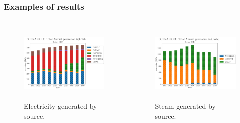 \begin{frame}
\frametitle{Examples of results}

	\begin{columns}
	\column[t]{5cm}
	\begin{figure}[htbp!]
		\begin{center}
			\includegraphics[height=3.8cm]{images/elc-generation.png}
		\end{center}
		\caption{Electricity generated by source.}
	\end{figure}

	\column[t]{5cm}
	\begin{figure}[htbp!]
		\begin{center}
			\includegraphics[height=3.8cm]{images/ind-generation.png}
		\end{center}
		\caption{Steam generated by source.}
	\end{figure}
	\end{columns}

\end{frame}


